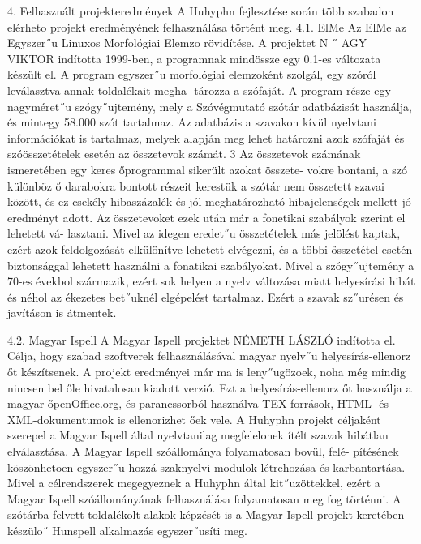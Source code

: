 \documentclass[11pt]{beamer}
\begin{document}
    \begin{frame}
        4. Felhasznált projekteredmények
        A Huhyphn fejlesztése során több szabadon elérheto projekt eredményének felhasználása
        történt meg.
        4.1. ElMe
        Az ElMe az Egyszer˝u Linuxos Morfológiai Elemzo rövidítése. A projektet N ˝ AGY VIKTOR
        indította 1999-ben, a programnak mindössze egy 0.1-es változata készült el. A program
        egyszer˝u morfológiai elemzoként szolgál, egy szóról leválasztva annak toldalékait megha-
        tározza a szófaját.
        A program része egy nagyméret˝u szógy˝ujtemény, mely a Szóvégmutató szótár adatbázisát használja, és mintegy 58.000 szót tartalmaz. Az adatbázis a szavakon kívül nyelvtani
        információkat is tartalmaz, melyek alapján meg lehet határozni azok szófaját és szóösszetételek esetén az összetevok számát.
        3
        Az összetevok számának ismeretében egy keres őprogrammal sikerült azokat összete-
        vokre bontani, a szó különböz ő darabokra bontott részeit kerestük a szótár nem összetett
        szavai között, és ez csekély hibaszázalék és jól meghatározható hibajelenségek mellett jó
        eredményt adott. Az összetevoket ezek után már a fonetikai szabályok szerint el lehetett vá-
        lasztani. Mivel az idegen eredet˝u összetételek más jelölést kaptak, ezért azok feldolgozását
        elkülönítve lehetett elvégezni, és a többi összetétel esetén biztonsággal lehetett használni a
        fonatikai szabályokat.
        Mivel a szógy˝ujtemény a 70-es évekbol származik, ezért sok helyen a nyelv változása
        miatt helyesírási hibát és néhol az ékezetes bet˝uknél elgépelést tartalmaz. Ezért a szavak
        sz˝urésen és javításon is átmentek.
    \end{frame}

    \begin{frame}
        4.2. Magyar Ispell
        A Magyar Ispell projektet NÉMETH LÁSZLÓ indította el. Célja, hogy szabad szoftverek
        felhasználásával magyar nyelv˝u helyesírás-ellenorz őt készítsenek. A projekt eredményei
        már ma is leny˝ugözoek, noha még mindig nincsen bel őle hivatalosan kiadott verzió.
        Ezt a helyesírás-ellenorz őt használja a magyar őpenOffice.org, és parancssorból használva TEX-források, HTML- és XML-dokumentumok is ellenorizhet őek vele.
        A Huhyphn projekt céljaként szerepel a Magyar Ispell által nyelvtanilag megfelelonek
        ítélt szavak hibátlan elválasztása. A Magyar Ispell szóállománya folyamatosan bovül, felé-
        pítésének köszönhetoen egyszer˝u hozzá szaknyelvi modulok létrehozása és karbantartása.
        Mivel a célrendszerek megegyeznek a Huhyphn által kit˝uzöttekkel, ezért a Magyar Ispell szóállományának felhasználása folyamatosan meg fog történni.
        A szótárba felvett toldalékolt alakok képzését is a Magyar Ispell projekt keretében készülo˝ Hunspell alkalmazás egyszer˝usíti meg.

    \end{frame}
\end{document}
